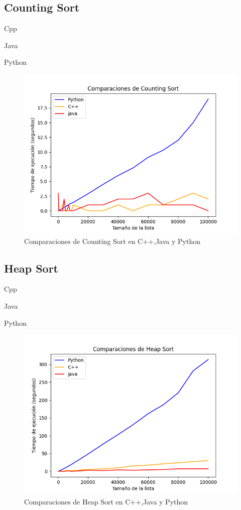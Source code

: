 \subsection{Counting Sort} 
Cpp

Java

Python


\begin{figure}[h]
    \centering
    \includegraphics[scale=.60]{img/counting sort.png}
    \caption{Comparaciones de Counting Sort en C++,Java y Python}
    \label{fig:primera_figura}
\end{figure}

\subsection{Heap Sort} 
Cpp

\vspace{3cm}
Java


Python


\begin{figure}[h]
    \centering
    \includegraphics[scale=.60]{img/heap sort.png}
    \caption{Comparaciones de Heap Sort en C++,Java y Python}
    \label{fig:primera_figura}
\end{figure}

